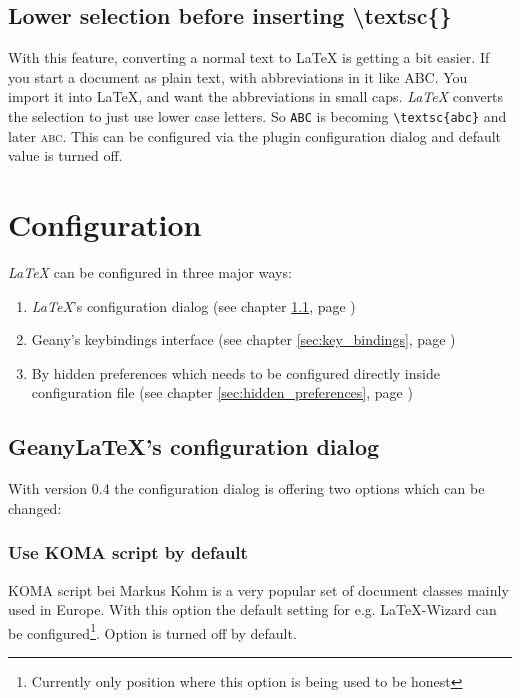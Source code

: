\documentclass[%
paper=a4,%
fontsize=11pt,%
twoside=false,%
DIV18,%
headsepline,%
plainheadsepline,%
footsepline,%
plainfootsepline,%
bibliography=totoc,%
listof=totoc,%
BCOR10mm,%
parskip=half,%
openany,%
]{scrartcl}
\begin{document}
\subsection{Lower selection before inserting \textbackslash{}textsc\{\}}

With this feature, converting a normal text to \LaTeX{} is getting a
bit easier. If you start a document as plain text, with
abbreviations in it like ABC. You import it into \LaTeX{}, and want
the abbreviations in small caps. \textit{LaTeX} converts the
selection to just use lower case letters. So \texttt{ABC} is
becoming \texttt{\textbackslash{}textsc\{abc\}} and later \textsc
{abc}. This can be configured via the plugin configuration dialog
and default value is turned off.

\section{Configuration}

\textit{LaTeX} can be configured in three major ways:
\begin{enumerate}
\item \textit{LaTeX}'s configuration dialog (see chapter \ref{sec:configuration_dialog},
	page \pageref{sec:configuration_dialog})
\item Geany's keybindings interface (see chapter \ref{sec:key_bindings},
	page \pageref{sec:key_bindings})
\item By hidden preferences which needs to be configured directly inside
	  configuration file (see chapter \ref{sec:hidden_preferences},
	page \pageref{sec:hidden_preferences})
\end{enumerate}

\subsection{GeanyLaTeX{}'s configuration dialog}
\label{sec:configuration_dialog}
With version 0.4 the configuration dialog is offering two options which
can be changed:

\subsubsection{Use KOMA script by default}
KOMA script bei Markus Kohm is a very popular set of document classes
mainly used in Europe. With this option the default setting for e.g.
\LaTeX{}-Wizard can be configured\footnote{Currently only position where
this option is being used to be honest}. Option is turned off by default.
\end{document}
